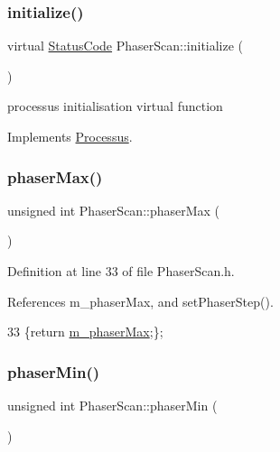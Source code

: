\subsubsection{\texorpdfstring{initialize()}{initialize()}}
{\footnotesize\ttfamily virtual \hyperlink{classStatusCode}{Status\+Code} Phaser\+Scan\+::initialize (\begin{DoxyParamCaption}{ }\end{DoxyParamCaption})\hspace{0.3cm}{\ttfamily [virtual]}}

processus initialisation virtual function 

Implements \hyperlink{classProcessus_aee88ad7b77ae7319cf8b128e9dd2ea11}{Processus}.

\mbox{\label{classPhaserScan_a2cccb1c5b687c5cdf934dd3eb11a73ad}} 
\subsubsection{\texorpdfstring{phaser\+Max()}{phaserMax()}}
{\footnotesize\ttfamily unsigned int Phaser\+Scan\+::phaser\+Max (\begin{DoxyParamCaption}{ }\end{DoxyParamCaption})\hspace{0.3cm}{\ttfamily [inline]}}



Definition at line 33 of file Phaser\+Scan.\+h.



References m\+\_\+phaser\+Max, and set\+Phaser\+Step().


\begin{DoxyCode}
33 \{\textcolor{keywordflow}{return} \hyperlink{classPhaserScan_ab47dd8cf441f9c713aa8c3e2251b382d}{m\_phaserMax};\};
\end{DoxyCode}
\mbox{\label{classPhaserScan_ab24e5fc6e36639ce31faf430ca87afc9}} 
\subsubsection{\texorpdfstring{phaser\+Min()}{phaserMin()}}
{\footnotesize\ttfamily unsigned int Phaser\+Scan\+::phaser\+Min (\begin{DoxyParamCaption}{ }\end{DoxyParamCaption})\hspace{0.3cm}{\ttfamily [inline]}}



